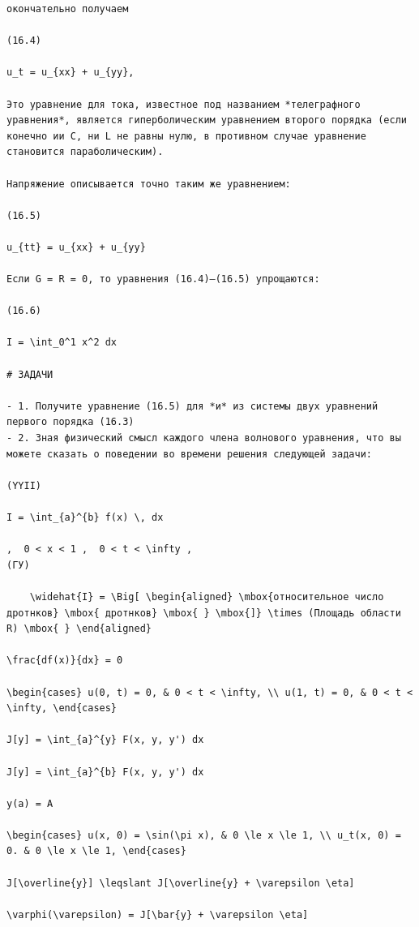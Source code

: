 \documentclass[
  ukrainian,
]{article}
\begin{document}
\begin{verbatim}
окончательно получаем

(16.4)

u_t = u_{xx} + u_{yy},

Это уравнение для тока, известное под названием *телеграфного уравнения*, является гиперболическим уравнением второго порядка (если конечно ии C, ни L не равны нулю, в противном случае уравнение становится параболическим).

Напряжение описывается точно таким же уравнением:

(16.5)

u_{tt} = u_{xx} + u_{yy}

Если G = R = 0, то уравнения (16.4)—(16.5) упрощаются:

(16.6)

I = \int_0^1 x^2 dx

# ЗАДАЧИ

- 1. Получите уравнение (16.5) для *и* из системы двух уравнений первого порядка (16.3)
- 2. Зная физический смысл каждого члена волнового уравнения, что вы можете сказать о поведении во времени решения следующей задачи:

(YYII)

I = \int_{a}^{b} f(x) \, dx

,  0 < x < 1 ,  0 < t < \infty ,  
(ГУ)

    \widehat{I} = \Big[ \begin{aligned} \mbox{относительное число дротнков} \mbox{ дротнков} \mbox{ } \mbox{]} \times (Площадь области R) \mbox{ } \end{aligned}

\frac{df(x)}{dx} = 0

\begin{cases} u(0, t) = 0, & 0 < t < \infty, \\ u(1, t) = 0, & 0 < t < \infty, \end{cases}

J[y] = \int_{a}^{y} F(x, y, y') dx

J[y] = \int_{a}^{b} F(x, y, y') dx

y(a) = A

\begin{cases} u(x, 0) = \sin(\pi x), & 0 \le x \le 1, \\ u_t(x, 0) = 0. & 0 \le x \le 1, \end{cases}

J[\overline{y}] \leqslant J[\overline{y} + \varepsilon \eta]

\varphi(\varepsilon) = J[\bar{y} + \varepsilon \eta]


\end{verbatim}
\end{document}

